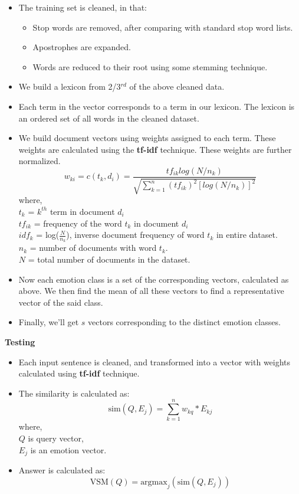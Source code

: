\begin{itemize}
\item The training set is cleaned, in that:
	\begin{itemize}
	\item Stop words are removed, after comparing with standard stop word lists.
	\item Apostrophes are expanded.
	\item Words are reduced to their root using some stemming technique.
	\end{itemize}
\item We build a lexicon from 2/3$^{rd}$ of the above cleaned data.
\item Each term in the vector corresponds to a term in our lexicon. The lexicon is an ordered set of all words in the cleaned dataset.
\item We build document vectors using weights assigned to each term. These weights are calculated using the \textbf{tf-idf} technique. These weights are further normalized.
$$
w_{ki}=c(t_k,d_i)=\frac{tf_{ik}log(N/n_k)}{\sqrt{\sum_{k=1}^{n} (tf_{ik})^{2}[log(N/n_k)]^2}}
$$
where, \\
$t_k$ = $k^{th}$ term in document $d_i$ \\
$tf_{ik}$ = frequency of the word $t_k$ in document $d_i$ \\
$idf_k$ = log($\frac{N}{n_k}$), inverse document frequency of word $t_k$ in  entire dataset. \\
$n_k$ = number of documents with word $t_k$. \\
$N$ = total number of documents in the dataset.
\item Now each emotion class is a set of the corresponding vectors, calculated as above. We then find the mean of all these vectors to find a representative vector of the said class.
\item Finally, we'll get $s$ vectors corresponding to the distinct emotion classes.
\end{itemize}
\textbf{Testing}
\begin{itemize}
\item Each input sentence is cleaned, and transformed into a vector with weights calculated using \textbf{tf-idf} technique.
\item The similarity is calculated as:
$$
\mbox{sim}(Q,E_j) = \sum_{k=1}^{n} w_{kq}*E_{kj}
$$
where,\\
$Q$ is query vector, \\
$E_j$ is an emotion vector.
\item Answer is calculated as:
$$
\mbox{VSM}(Q) = \mbox{argmax}_{j} (\mbox{sim}(Q, E_j))
$$
\end{itemize}

